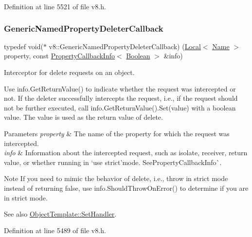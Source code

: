 Definition at line 5521 of file v8.\+h.

\mbox{\label{namespacev8_ad2aecc0406ea4bc02d5a4f84a433b273}} 
\subsubsection{\texorpdfstring{Generic\+Named\+Property\+Deleter\+Callback}{GenericNamedPropertyDeleterCallback}}
{\footnotesize\ttfamily typedef void($\ast$ v8\+::\+Generic\+Named\+Property\+Deleter\+Callback) (\mbox{\hyperlink{classv8_1_1Local}{Local}}$<$ \mbox{\hyperlink{classv8_1_1Name}{Name}} $>$ property, const \mbox{\hyperlink{classv8_1_1PropertyCallbackInfo}{Property\+Callback\+Info}}$<$ \mbox{\hyperlink{classv8_1_1Boolean}{Boolean}} $>$ \&info)}

Interceptor for delete requests on an object.

Use {\ttfamily info.\+Get\+Return\+Value()} to indicate whether the request was intercepted or not. If the deleter successfully intercepts the request, i.\+e., if the request should not be further executed, call {\ttfamily info.\+Get\+Return\+Value().Set(value)} with a boolean {\ttfamily value}. The {\ttfamily value} is used as the return value of {\ttfamily delete}.


\begin{DoxyParams}{Parameters}
{\em property} & The name of the property for which the request was intercepted. \\
\hline
{\em info} & Information about the intercepted request, such as isolate, receiver, return value, or whether running in `\textquotesingle{}use strict'{\ttfamily mode. See}Property\+Callback\+Info\`{}.\\
\hline
\end{DoxyParams}
\begin{DoxyNote}{Note}
If you need to mimic the behavior of {\ttfamily delete}, i.\+e., throw in strict mode instead of returning false, use {\ttfamily info.\+Should\+Throw\+On\+Error()} to determine if you are in strict mode.
\end{DoxyNote}
See also {\ttfamily \mbox{\hyperlink{classv8_1_1ObjectTemplate_a3d5666f1e9b0f46df6b4dbb7cfbb6114}{Object\+Template\+::\+Set\+Handler}}.} 

Definition at line 5489 of file v8.\+h.

